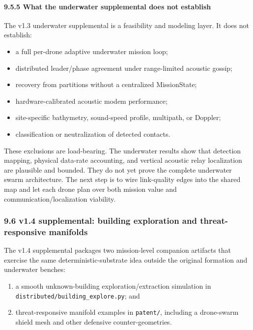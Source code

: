 \paragraph{9.5.5 What the underwater supplemental does not
establish}\label{what-the-underwater-supplemental-does-not-establish}

The v1.3 underwater supplemental is a feasibility and modeling layer. It
does not establish:

\begin{itemize}
\tightlist
\item
  a full per-drone adaptive underwater mission loop;
\item
  distributed leader/phase agreement under range-limited acoustic
  gossip;
\item
  recovery from partitions without a centralized MissionState;
\item
  hardware-calibrated acoustic modem performance;
\item
  site-specific bathymetry, sound-speed profile, multipath, or Doppler;
\item
  classification or neutralization of detected contacts.
\end{itemize}

These exclusions are load-bearing. The underwater results show that
detection mapping, physical data-rate accounting, and vertical acoustic
relay localization are plausible and bounded. They do not yet prove the
complete underwater swarm architecture. The next step is to wire
link-quality edges into the shared map and let each drone plan over both
mission value and communication/localization viability.

\subsubsection{9.6 v1.4 supplemental: building exploration and
threat-responsive
manifolds}\label{v1.4-supplemental-building-exploration-and-threat-responsive-manifolds}

The v1.4 supplemental packages two mission-level companion artifacts
that exercise the same deterministic-substrate idea outside the original
formation and underwater benches:

\begin{enumerate}
\def\labelenumi{\arabic{enumi}.}
\tightlist
\item
  a smooth unknown-building exploration/extraction simulation in
  \texttt{distributed/building\_explore.py}; and
\item
  threat-responsive manifold examples in \texttt{patent/}, including a
  drone-swarm shield mesh and other defensive counter-geometries.
\end{enumerate}


